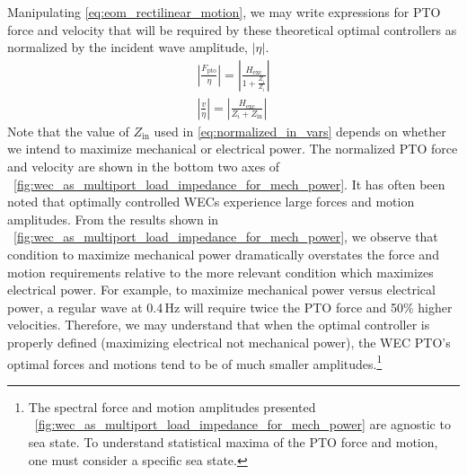 \documentclass[5p,times]{elsarticle}
\begin{document}
Manipulating \eqref{eq:eom_rectilinear_motion}, we may write expressions for PTO force and velocity that will be required by these theoretical optimal controllers as normalized by the incident wave amplitude, $ |\eta |$.
%
\begin{subequations}
\begin{align}
\left| \frac{F_{\mathrm{pto}}}{\eta} \right| = \left| \frac{H_{\textrm{exc}}}{ 1 + \frac{Z_i}{Z_i}} \right| \\[1em]
\left| \frac{v}{\eta} \right| = \left| \frac{H_{\textrm{exc}}}{Z_i + Z_\textrm{in}} \right|
\end{align}
\label{eq:normalized_in_vars}
\end{subequations}
%
Note that the value of $Z_{\textrm{in}}$ used in \eqref{eq:normalized_in_vars} depends on whether we intend to maximize mechanical or electrical power.
The normalized PTO force and velocity are shown in the bottom two axes of \figurename~\ref{fig:wec_as_multiport_load_impedance_for_mech_power}.
It has often been noted that optimally controlled WECs experience large forces and motion amplitudes.
From the results shown in \figurename~\ref{fig:wec_as_multiport_load_impedance_for_mech_power}, we observe that condition to maximize mechanical power dramatically overstates the force and motion requirements relative to the more relevant condition which maximizes electrical power.
For example, to maximize mechanical power versus electrical power, a regular wave at 0.4\,Hz will require twice the PTO force and 50\% higher velocities.
Therefore, we may understand that when the optimal controller is properly defined (maximizing electrical not mechanical power), the WEC PTO's optimal forces and motions tend to be of much smaller amplitudes.\footnote{The spectral force and motion amplitudes presented \figurename~\ref{fig:wec_as_multiport_load_impedance_for_mech_power} are agnostic to sea state. To understand statistical maxima of the PTO force and motion, one must consider a specific sea state.}
\end{document}
